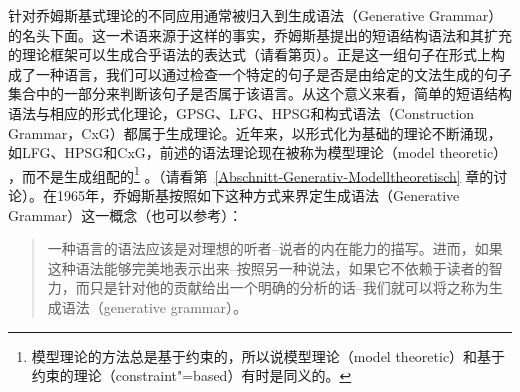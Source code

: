 针对乔姆斯基式理论的不同应用通常被归入到生成语法（Generative Grammar）的名头下面。这一术语来源于这样的事实，乔姆斯基提出的短语结构语法和其扩充的理论框架可以生成合乎语法的表达式（请看第\pageref{Seite-generiert}页）。正是这一组句子在形式上构成了一种语言，我们可以通过检查一个特定的句子是否是由给定的文法生成的句子集合中的一部分来判断该句子是否属于该语言。从这个意义来看，简单的短语结构语法与相应的形式化理论，GPSG、LFG、HPSG和构式语法（Construction Grammar，CxG）都属于生成理论。近年来，以形式化为基础的理论不断涌现，如LFG、HPSG和CxG，前述的语法理论现在被称为模型理论（model theoretic） ，而不是生成组配的\footnote{
模型理论的方法总是基于约束的，所以说模型理论（model theoretic）和基于约束的理论（constraint"=based）有时是同义的。} 。（请看第~\ref{Abschnitt-Generativ-Modelltheoretisch} 章的讨论）。在1965年，乔姆斯基按照如下这种方式来界定生成语法（Generative Grammar）这一概念（也可以参考\citealp[]{Chomsky95a-u}）：
\begin{quote}
一种语言的语法应该是对理想的听者--说者的内在能力的描写。进而，如果这种语法能够完美地表示出来--按照另一种说法，如果它不依赖于读者的智力，而只是针对他的贡献给出一个明确的分析的话--我们就可以将之称为生成语法（generative
  grammar）。\citep[]{Chomsky65a}
\end{quote}
